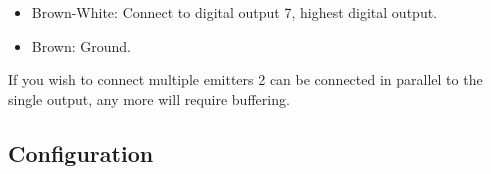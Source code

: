 	\begin{itemize}
	  
	  \item{Brown-White:} Connect to digital output 7, highest digital output.
	  		
	  \item{Brown:} Ground.
	  			
	\end{itemize}

If you wish to connect multiple emitters 2 can be connected in parallel to the single output, any more will require buffering.
    
\subsection{Configuration}

